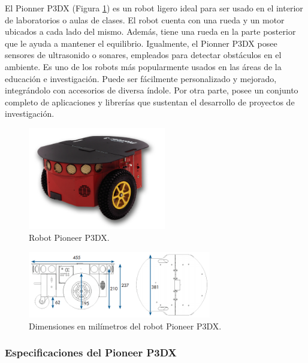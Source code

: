 \documentclass[11pt,twoside,A5]{article}
\newcommand{\reffigure}[1]{Figura \ref{#1}}
\newcommand{\refpfigure}[1]{(\reffigure{#1})}
\begin{document}
El Pionner P3DX \refpfigure{fig:pioneer} es un robot ligero ideal para ser usado en el interior de laboratorios o aulas de clases. El robot cuenta con una rueda y un motor ubicados a cada lado del mismo. Además, tiene una rueda en la parte posterior que le ayuda a mantener el equilibrio.
Igualmente, el Pionner P3DX posee sensores de ultrasonido o sonares, empleados para detectar obstáculos en el ambiente.
Es uno de los robots más popularmente usados en las áreas de la educación e investigación. Puede ser fácilmente personalizado y mejorado, integrándolo con accesorios de diversa índole. Por otra parte, posee un conjunto completo de aplicaciones y librerías que sustentan el desarrollo de proyectos de investigación.

\begin{figure}[here]
	\centering
	\includegraphics[width=6cm]{pioneer.png} 
	\caption{Robot Pioneer P3DX.}
	\label{fig:pioneer}
\end{figure} 

\begin{figure}[here]
	\centering
	\includegraphics[width=8cm]{pioneer-dimensiones.png} 
	\caption{Dimensiones en milímetros del robot Pioneer P3DX.}
	\label{fig:pioneer-dimensiones}
\end{figure} 

\subsubsection*{Especificaciones del Pioneer P3DX}
\end{document}
